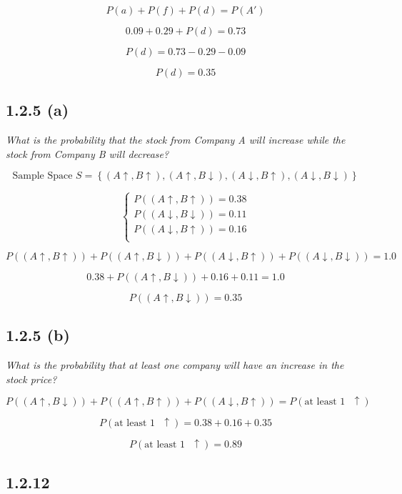 \documentclass{article}
\begin{document}
\[
P(a) + P(f) + P(d) = P(A')
\]

\[
0.09 + 0.29 + P(d) = 0.73
\]

\[
P(d) = 0.73 - 0.29 - 0.09
\]

\[
\boxed{P(d) = 0.35}
\]

\subsection*{1.2.5 (a)}

\textit{What is the probability that the stock from Company A will increase while the stock from Company B will decrease?}

\[
\text{Sample Space } S=\left\{
\left(A\uparrow, B\uparrow\right),
\left(A\uparrow, B\downarrow\right),
\left(A\downarrow, B\uparrow\right),
\left(A\downarrow, B\downarrow\right)
\right\}
\]

\[
\begin{cases}
P((A\uparrow, B\uparrow)) = 0.38 \\
P((A\downarrow, B\downarrow)) = 0.11 \\
P((A\downarrow, B\uparrow)) = 0.16 \\
\end{cases}
\]

\[
P((A\uparrow, B\uparrow)) +
P((A\uparrow, B\downarrow)) +
P((A\downarrow, B\uparrow)) +
P((A\downarrow, B\downarrow)) =
1.0
\]

\[
0.38 + P((A\uparrow, B\downarrow)) + 0.16 + 0.11 = 1.0
\]

\[
\boxed{P((A\uparrow, B\downarrow)) = 0.35}
\]

\subsection*{1.2.5 (b)}

\textit{What is the probability that at least one company will have an increase in the stock price?}

\[
P((A\uparrow, B\downarrow)) +
P((A\uparrow, B\uparrow)) +
P((A\downarrow, B\uparrow)) = P(\text{at least } 1 \text{ }\uparrow)
\]

\[
P(\text{at least } 1 \text{ }\uparrow) =
0.38 + 0.16 + 0.35
\]

\[
\boxed{P(\text{at least } 1 \text{ }\uparrow) = 0.89}
\]

\subsection*{1.2.12}
\end{document}
